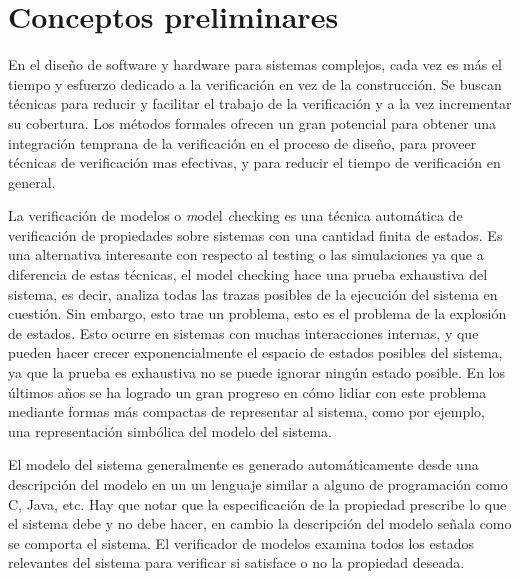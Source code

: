 \chapter{Conceptos preliminares}

En el diseño de software y hardware para sistemas complejos, cada vez es más el tiempo y esfuerzo dedicado a la verificación en vez de la construcción. Se buscan técnicas para reducir y facilitar el trabajo de la verificación y a la vez incrementar su cobertura. Los métodos formales ofrecen un gran potencial para obtener una integración temprana de la verificación en el proceso de diseño, para proveer técnicas de verificación mas efectivas, y para reducir el tiempo de verificación en general.

La verificación de modelos o \emph model \emph checking es una técnica automática de verificación de propiedades sobre sistemas con una cantidad finita de estados. Es una alternativa interesante con respecto al testing o las simulaciones ya que a diferencia de estas técnicas, el model checking hace una prueba exhaustiva del sistema, es decir, analiza todas las trazas posibles de la ejecución del sistema en cuestión. Sin embargo, esto trae un problema, esto es el problema de la explosión de estados. Esto ocurre en sistemas con muchas interacciones internas, y que pueden hacer crecer exponencialmente el espacio de estados posibles del sistema, ya que la prueba es exhaustiva no se puede ignorar ningún estado posible. En los últimos años se ha logrado un gran progreso en cómo lidiar con este problema mediante formas más compactas de representar al sistema, como por ejemplo, una representación simbólica del modelo del sistema.

El modelo del sistema generalmente es generado automáticamente desde una descripción del modelo en un un lenguaje similar a alguno de programación como C, Java, etc. Hay que notar que la especificación de la propiedad prescribe lo que el sistema debe y no debe hacer, en cambio la descripción del modelo señala como se comporta el sistema. El verificador de modelos examina todos los estados relevantes del sistema para verificar si satisface o no la propiedad deseada.

